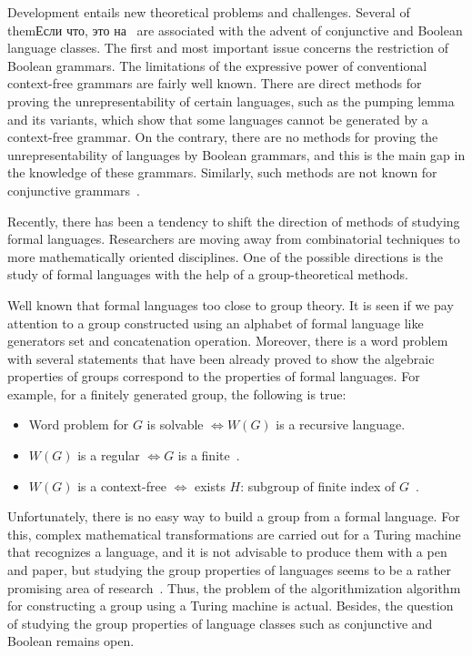 \documentclass[conference]{IEEEtran}
\theoremstyle{definition}
\begin{document}
Development entails new theoretical problems and challenges.
Several of themЕсли что, это на  are associated with the advent of conjunctive and Boolean language classes.
The first and most important issue concerns the restriction of Boolean grammars.
The limitations of the expressive power of conventional context-free grammars are fairly well known. There are direct methods for proving the unrepresentability of certain languages,
such as the pumping lemma and its variants, which show that some languages
cannot be generated by a context-free grammar. On the contrary, there are no methods
for proving the unrepresentability of languages by Boolean grammars, and this
is the main gap in the knowledge of these grammars. Similarly,
such methods are not known for conjunctive grammars~\cite{OKHOTIN201327}.

Recently, there has been a tendency to shift the direction of methods of studying formal languages.
Researchers are moving away from combinatorial techniques to more mathematically oriented disciplines.
One of the possible directions is the study of formal languages with the help of
a group-theoretical methods.

Well known that formal languages too close to group theory.
It is seen if we pay attention to a group constructed using an alphabet of
formal language like generators set and concatenation operation. Moreover,
there is a word problem with several statements that have been already
proved to show the algebraic properties of groups correspond to the properties of formal languages.
For example, for a finitely generated group, the following is true:
\begin{itemize}
    \item Word problem for $G$ is solvable $\iff W(G)$ is a recursive language.
    \item $W(G)$ is a regular $\iff G$ is a finite~\cite{Anisimov}.
    \item $W(G)$ is a context-free $\iff$ exists $H$: subgroup of finite index of $G$~\cite{Muller}.
\end{itemize}
Unfortunately, there is no easy way to build a group from a formal language.
For this, complex mathematical transformations are carried out for a Turing machine
that recognizes a language, and it is not advisable to produce them with a pen and paper,
but studying the group properties of languages seems to be a rather promising
area of research~\cite{Sapir, SpaceFunc}.
Thus, the problem of the algorithmization algorithm
for constructing a group using a Turing machine is actual.
Besides, the question of studying the group properties of language classes
such as conjunctive and Boolean remains open.
\end{document}
